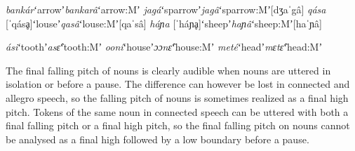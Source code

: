 \documentclass[output=paper,modfonts,nonflat,hidelinks]{langsci/langscibook}
\begin{document}
\begin{exe}
\ex \label{ex:Petrollino:masculine} \begin{xlist}
\ex \textit{bankár}\hspace{10mm}ʻarrowʼ\hspace{10mm}\textit{bankarâ}\hspace{10mm}ʻarrow:Mʼ\label{ex:Petrollino:bankár} 
\ex \textit{jagá}\hspace{15mm}ʻsparrowʼ\hspace{6mm}\textit{jagâ}\hspace{16mm}ʻsparrow:Mʼ\hspace{5mm}[dʒaˈgâ]\label{ex:Petrollino:jagá}
\ex \textit{qása} [ˈqásḁ]\hspace{4mm}ʻlouseʼ\hspace{10mm}\textit{qasâ}\hspace{16mm}ʻlouse:Mʼ\hspace{10mm}[qaˈsâ]\label{ex:Petrollino:qasa}
\ex \textit{háɲa} [ˈháɲḁ]\hspace{3mm}ʻsheepʼ\hspace{9mm}\textit{haɲâ}\hspace{15mm}ʻsheep:Mʼ\hspace{9mm}[haˈɲâ] \label{ex:Petrollino:haɲa}
\end{xlist}
\end{exe}

\begin{exe}
\ex \label{ex:Petrollino:heightharmony} \begin{xlist}
\ex \textit{ási}\hspace{17mm}ʻtoothʼ\hspace{11mm}\textit{asɛ̂}\hspace{17mm}ʻtooth:Mʼ\label{ex:Petrollino:asi}
\ex \textit{ooní}\hspace{15mm}ʻhouseʼ\hspace{10mm}\textit{ɔɔnɛ̂}\hspace{15mm}ʻhouse:Mʼ\label{ex:Petrollino:house}
\ex \textit{meté}\hspace{15mm}ʻheadʼ\hspace{11mm}\textit{mɛtɛ̂}\hspace{15mm}ʻhead:Mʼ\label{ex:Petrollino:mɛtɛ}
\end{xlist}
\end{exe}
The final falling pitch of  nouns is clearly audible when nouns are uttered in isolation or before a pause. The difference can however be lost in connected and allegro speech, so the falling pitch of  nouns is sometimes realized as a final high pitch. Tokens of the same  noun in connected speech can be uttered with both a final falling pitch or a final high pitch, so the final falling pitch on  nouns cannot be analysed as a final high  followed by a low boundary  before a pause.
\end{document}
